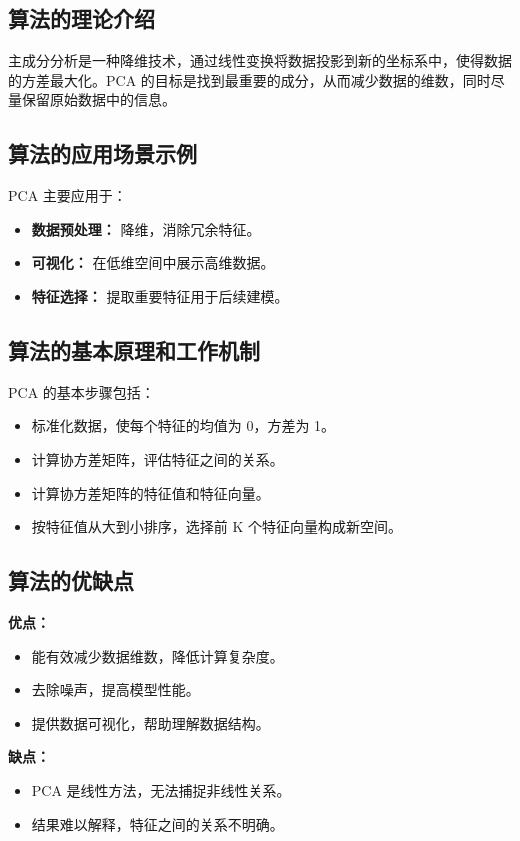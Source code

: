 \subsection*{算法的理论介绍}
主成分分析是一种降维技术，通过线性变换将数据投影到新的坐标系中，使得数据的方差最大化。PCA 的目标是找到最重要的成分，从而减少数据的维数，同时尽量保留原始数据中的信息。

\subsection*{算法的应用场景示例}
PCA 主要应用于：
\begin{itemize}
    \item \textbf{数据预处理：} 降维，消除冗余特征。
    \item \textbf{可视化：} 在低维空间中展示高维数据。
    \item \textbf{特征选择：} 提取重要特征用于后续建模。
\end{itemize}

\subsection*{算法的基本原理和工作机制}
PCA 的基本步骤包括：
\begin{itemize}
    \item 标准化数据，使每个特征的均值为 0，方差为 1。
    \item 计算协方差矩阵，评估特征之间的关系。
    \item 计算协方差矩阵的特征值和特征向量。
    \item 按特征值从大到小排序，选择前 K 个特征向量构成新空间。
\end{itemize}

\subsection*{算法的优缺点}
\textbf{优点：}
\begin{itemize}
    \item 能有效减少数据维数，降低计算复杂度。
    \item 去除噪声，提高模型性能。
    \item 提供数据可视化，帮助理解数据结构。
\end{itemize}

\textbf{缺点：}
\begin{itemize}
    \item PCA 是线性方法，无法捕捉非线性关系。
    \item 结果难以解释，特征之间的关系不明确。
\end{itemize}


